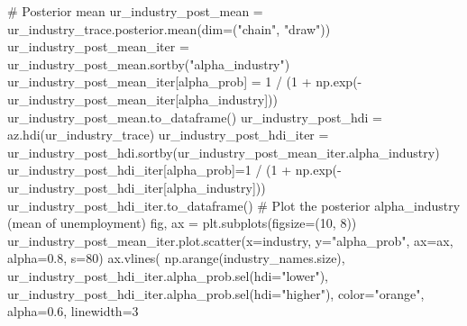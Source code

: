 \documentclass[
]{agujournal2019}
\newenvironment{Shaded}{\begin{snugshade}}{\end{snugshade}}
\newcommand{\CommentTok}[1]{\textcolor[rgb]{0.37,0.37,0.37}{#1}}
\newcommand{\DecValTok}[1]{\textcolor[rgb]{0.68,0.00,0.00}{#1}}
\newcommand{\FloatTok}[1]{\textcolor[rgb]{0.68,0.00,0.00}{#1}}
\newcommand{\NormalTok}[1]{\textcolor[rgb]{0.00,0.23,0.31}{#1}}
\newcommand{\OperatorTok}[1]{\textcolor[rgb]{0.37,0.37,0.37}{#1}}
\newcommand{\StringTok}[1]{\textcolor[rgb]{0.13,0.47,0.30}{#1}}
\begin{document}
\begin{Shaded}
\begin{Highlighting}[]
\CommentTok{\# Posterior mean}
\NormalTok{ur\_industry\_post\_mean }\OperatorTok{=}\NormalTok{ ur\_industry\_trace.posterior.mean(dim}\OperatorTok{=}\NormalTok{(}\StringTok{"chain"}\NormalTok{, }\StringTok{"draw"}\NormalTok{))}
\NormalTok{ur\_industry\_post\_mean\_iter }\OperatorTok{=}\NormalTok{ ur\_industry\_post\_mean.sortby(}\StringTok{"alpha\_industry"}\NormalTok{)}
\NormalTok{ur\_industry\_post\_mean\_iter[}\StringTok{\textquotesingle{}alpha\_prob\textquotesingle{}}\NormalTok{] }\OperatorTok{=} \DecValTok{1} \OperatorTok{/}\NormalTok{ (}\DecValTok{1} \OperatorTok{+}\NormalTok{ np.exp(}\OperatorTok{{-}}\NormalTok{ur\_industry\_post\_mean\_iter[}\StringTok{\textquotesingle{}alpha\_industry\textquotesingle{}}\NormalTok{]))}
\NormalTok{ur\_industry\_post\_mean.to\_dataframe()}
\NormalTok{ur\_industry\_post\_hdi }\OperatorTok{=}\NormalTok{ az.hdi(ur\_industry\_trace)}
\NormalTok{ur\_industry\_post\_hdi\_iter }\OperatorTok{=}\NormalTok{ ur\_industry\_post\_hdi.sortby(ur\_industry\_post\_mean\_iter.alpha\_industry)}
\NormalTok{ur\_industry\_post\_hdi\_iter[}\StringTok{\textquotesingle{}alpha\_prob\textquotesingle{}}\NormalTok{]}\OperatorTok{=}\DecValTok{1} \OperatorTok{/}\NormalTok{ (}\DecValTok{1} \OperatorTok{+}\NormalTok{ np.exp(}\OperatorTok{{-}}\NormalTok{ur\_industry\_post\_hdi\_iter[}\StringTok{\textquotesingle{}alpha\_industry\textquotesingle{}}\NormalTok{]))}
\NormalTok{ur\_industry\_post\_hdi\_iter.to\_dataframe()}
\CommentTok{\# Plot the posterior alpha\_industry (mean of unemployment)}
\NormalTok{fig, ax }\OperatorTok{=}\NormalTok{ plt.subplots(figsize}\OperatorTok{=}\NormalTok{(}\DecValTok{10}\NormalTok{, }\DecValTok{8}\NormalTok{))}
\NormalTok{ur\_industry\_post\_mean\_iter.plot.scatter(x}\OperatorTok{=}\StringTok{\textquotesingle{}industry\textquotesingle{}}\NormalTok{, y}\OperatorTok{=}\StringTok{"alpha\_prob"}\NormalTok{, ax}\OperatorTok{=}\NormalTok{ax, alpha}\OperatorTok{=}\FloatTok{0.8}\NormalTok{, s}\OperatorTok{=}\DecValTok{80}\NormalTok{)}
\NormalTok{ax.vlines(}
\NormalTok{    np.arange(industry\_names.size),}
\NormalTok{    ur\_industry\_post\_hdi\_iter.alpha\_prob.sel(hdi}\OperatorTok{=}\StringTok{"lower"}\NormalTok{),}
\NormalTok{    ur\_industry\_post\_hdi\_iter.alpha\_prob.sel(hdi}\OperatorTok{=}\StringTok{"higher"}\NormalTok{),}
\NormalTok{    color}\OperatorTok{=}\StringTok{"orange"}\NormalTok{,}
\NormalTok{    alpha}\OperatorTok{=}\FloatTok{0.6}\NormalTok{,}
\NormalTok{    linewidth}\OperatorTok{=}\DecValTok{3}

\end{Highlighting}
\end{Shaded}
\end{document}
